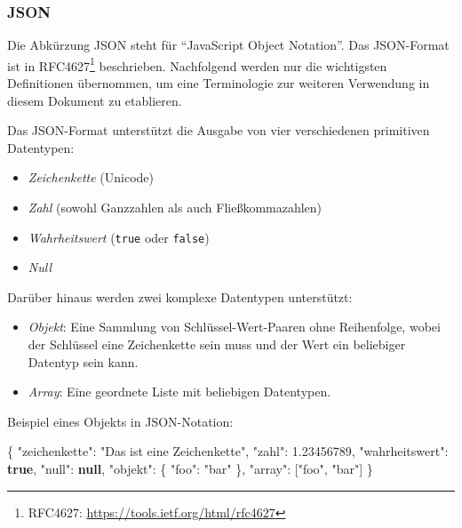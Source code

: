 \documentclass[,a4paper]{article}
\newenvironment{Shaded}{}{}
\newcommand{\KeywordTok}[1]{\textcolor[rgb]{0.00,0.44,0.13}{\textbf{{#1}}}}
\newcommand{\DataTypeTok}[1]{\textcolor[rgb]{0.56,0.13,0.00}{{#1}}}
\newcommand{\FloatTok}[1]{\textcolor[rgb]{0.25,0.63,0.44}{{#1}}}
\newcommand{\StringTok}[1]{\textcolor[rgb]{0.25,0.44,0.63}{{#1}}}
\newcommand{\OtherTok}[1]{\textcolor[rgb]{0.00,0.44,0.13}{{#1}}}
\newcommand{\FunctionTok}[1]{\textcolor[rgb]{0.02,0.16,0.49}{{#1}}}
\begin{document}
\subsubsection{JSON}\label{json}

Die Abkürzung JSON steht für ``JavaScript Object Notation''. Das
JSON-Format ist in RFC4627\footnote{RFC4627:
  \url{https://tools.ietf.org/html/rfc4627}} beschrieben. Nachfolgend
werden nur die wichtigsten Definitionen übernommen, um eine Terminologie
zur weiteren Verwendung in diesem Dokument zu etablieren.

Das JSON-Format unterstützt die Ausgabe von vier verschiedenen
primitiven Datentypen:

\begin{itemize}
\itemsep1pt\parskip0pt
\item
  \emph{Zeichenkette} (Unicode)
\item
  \emph{Zahl} (sowohl Ganzzahlen als auch Fließkommazahlen)
\item
  \emph{Wahrheitswert} (\texttt{true} oder \texttt{false})
\item
  \emph{Null}
\end{itemize}

Darüber hinaus werden zwei komplexe Datentypen unterstützt:

\begin{itemize}
\itemsep1pt\parskip0pt
\item
  \emph{Objekt}: Eine Sammlung von Schlüssel-Wert-Paaren ohne
  Reihenfolge, wobei der Schlüssel eine Zeichenkette sein muss und der
  Wert ein beliebiger Datentyp sein kann.
\item
  \emph{Array}: Eine geordnete Liste mit beliebigen Datentypen.
\end{itemize}

Beispiel eines Objekts in JSON-Notation:

\begin{Shaded}
\begin{Highlighting}[]
\FunctionTok{\{}
    \DataTypeTok{"zeichenkette"}\FunctionTok{:} \StringTok{"Das ist eine Zeichenkette"}\FunctionTok{,}
    \DataTypeTok{"zahl"}\FunctionTok{:} \FloatTok{1.23456789}\FunctionTok{,}
    \DataTypeTok{"wahrheitswert"}\FunctionTok{:} \KeywordTok{true}\FunctionTok{,}
    \DataTypeTok{"null"}\FunctionTok{:} \KeywordTok{null}\FunctionTok{,}
    \DataTypeTok{"objekt"}\FunctionTok{:} \FunctionTok{\{}
        \DataTypeTok{"foo"}\FunctionTok{:} \StringTok{"bar"}
    \FunctionTok{\},}
    \DataTypeTok{"array"}\FunctionTok{:} \OtherTok{[}\StringTok{"foo"}\OtherTok{,} \StringTok{"bar"}\OtherTok{]}
\FunctionTok{\}}
\end{Highlighting}
\end{Shaded}
\end{document}
